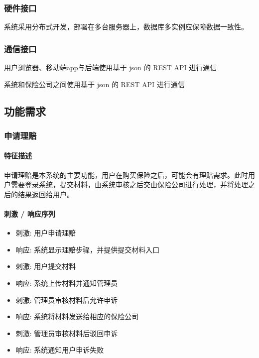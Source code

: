 \documentclass[a4paper]{ctexart}
\begin{document}
\subsubsection{硬件接口}

系统采用分布式开发，部署在多台服务器上，数据库多实例应保障数据一致性。

\subsubsection{通信接口}

用户浏览器、移动端app与后端使用基于 json 的 REST API 进行通信 

系统和保险公司之间使用基于 json 的 REST API 进行通信


\subsection{功能需求}

\subsubsection{申请理赔}

\paragraph{特征描述}

申请理赔是本系统的主要功能，用户在购买保险之后，可能会有理赔需求。此时用户需要登录系统，提交材料，由系统审核之后交由保险公司进行处理，并将处理之后的结果返回给用户。

\paragraph{刺激 / 响应序列}

\begin{itemize}
  \item 刺激: 用户申请理赔
  \item 响应: 系统显示理赔步骤，并提供提交材料入口
  \item 刺激: 用户提交材料
  \item 响应: 系统上传材料并通知管理员
  \item 刺激: 管理员审核材料后允许申诉
  \item 响应: 系统将材料发送给相应的保险公司
  \item 刺激: 管理员审核材料后驳回申诉
  \item 响应: 系统通知用户申诉失败
\end{itemize}
\end{document}
